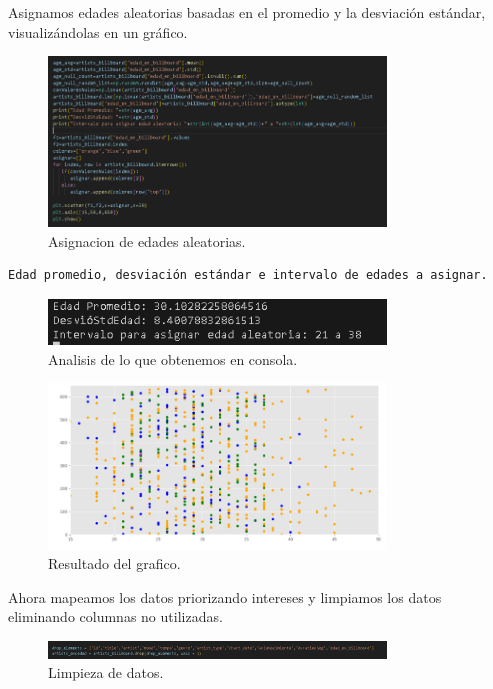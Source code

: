 \documentclass[a4paper,12pt]{article}
\begin{document}
Asignamos edades aleatorias basadas en el promedio y la desviación estándar, visualizándolas en un gráfico.

\begin{figure}[H]
    \centering
    \includegraphics[width=0.8\textwidth]{15.png}
    \caption{Asignacion de edades aleatorias.}
\end{figure}

\begin{verbatim}
Edad promedio, desviación estándar e intervalo de edades a asignar.
\end{verbatim}

\begin{figure}[H]
    \centering
    \includegraphics[width=0.8\textwidth]{16.png}
    \caption{Analisis de lo que obtenemos en consola.}
\end{figure}

\begin{figure}[H]
    \centering
    \includegraphics[width=0.8\textwidth]{17.png}
    \caption{Resultado del grafico.}
\end{figure}

Ahora mapeamos los datos priorizando intereses y limpiamos los datos eliminando columnas no utilizadas.

\begin{figure}[H]
    \centering
    \includegraphics[width=0.8\textwidth]{18.png}
    \caption{Limpieza de datos.}
\end{figure}
\end{document}
